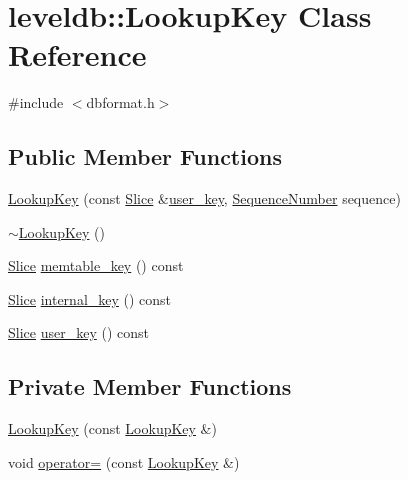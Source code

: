 \hypertarget{classleveldb_1_1_lookup_key}{\section{leveldb\-:\-:Lookup\-Key Class Reference}
\label{classleveldb_1_1_lookup_key}
}


{\ttfamily \#include $<$dbformat.\-h$>$}

\subsection*{Public Member Functions}
\begin{DoxyCompactItemize}
\item 
\hyperlink{classleveldb_1_1_lookup_key_acd09aa56607ced962e1b458d05d53472}{Lookup\-Key} (const \hyperlink{classleveldb_1_1_slice}{Slice} \&\hyperlink{classleveldb_1_1_lookup_key_adf91e9804383dd1b2bfd8545df45342f}{user\-\_\-key}, \hyperlink{namespaceleveldb_a5481ededd221c36d652c371249f869fa}{Sequence\-Number} sequence)
\item 
\hyperlink{classleveldb_1_1_lookup_key_a1ed5751c159540217aa5d702fdf83a98}{$\sim$\-Lookup\-Key} ()
\item 
\hyperlink{classleveldb_1_1_slice}{Slice} \hyperlink{classleveldb_1_1_lookup_key_a16b7ee6c701da7e7503510880a106a3a}{memtable\-\_\-key} () const 
\item 
\hyperlink{classleveldb_1_1_slice}{Slice} \hyperlink{classleveldb_1_1_lookup_key_a3578de91f795e450b05a870795339b40}{internal\-\_\-key} () const 
\item 
\hyperlink{classleveldb_1_1_slice}{Slice} \hyperlink{classleveldb_1_1_lookup_key_adf91e9804383dd1b2bfd8545df45342f}{user\-\_\-key} () const 
\end{DoxyCompactItemize}
\subsection*{Private Member Functions}
\begin{DoxyCompactItemize}
\item 
\hyperlink{classleveldb_1_1_lookup_key_a82f523ec2effa0fe5b8320437a12fc70}{Lookup\-Key} (const \hyperlink{classleveldb_1_1_lookup_key}{Lookup\-Key} \&)
\item 
void \hyperlink{classleveldb_1_1_lookup_key_a6117f889adea2efbe2bc35bc32bc0362}{operator=} (const \hyperlink{classleveldb_1_1_lookup_key}{Lookup\-Key} \&)
\end{DoxyCompactItemize}
